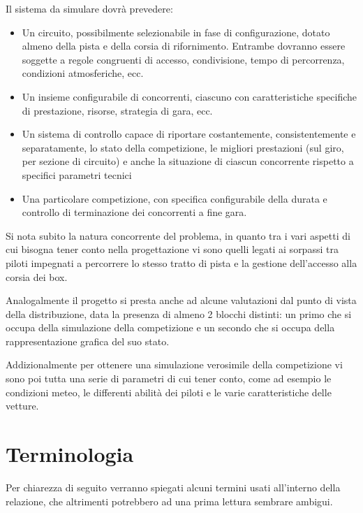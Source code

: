 \documentclass[a4paper,11pt, twoside, openright]{book}
\begin{document}
      Il sistema da simulare dovrà prevedere:
      \begin{itemize}
	\item Un circuito, possibilmente selezionabile in fase di configurazione, dotato almeno della pista e della corsia di 
	  rifornimento.
	  Entrambe dovranno essere soggette a regole congruenti di accesso, condivisione, 
	  tempo di percorrenza, condizioni atmosferiche, ecc.
	\item Un insieme configurabile di concorrenti, ciascuno con caratteristiche specifiche di prestazione, risorse, 
	  strategia di gara, ecc.
	\item Un sistema di controllo capace di riportare costantemente, consistentemente e separatamente, 
	  lo stato della competizione, le migliori prestazioni (sul giro, per sezione di circuito) e anche la 
	  situazione di ciascun concorrente rispetto a specifici parametri tecnici
	\item Una particolare competizione, con specifica configurabile della durata e controllo di terminazione 
	  dei concorrenti a fine gara.
      \end{itemize}
      
      Si nota subito la natura concorrente del problema, in quanto tra i vari aspetti di cui bisogna tener conto
      nella progettazione vi sono quelli legati ai sorpassi tra piloti impegnati a percorrere lo stesso tratto di pista
      e la gestione dell'accesso alla corsia dei box.
      
      Analogalmente il progetto si presta anche ad alcune valutazioni dal punto di vista della distribuzione, data
      la presenza di almeno 2 blocchi distinti: un primo che si occupa della simulazione della competizione e un secondo
      che si occupa della rappresentazione grafica del suo stato.
      
      Addizionalmente per ottenere una simulazione verosimile
      della competizione 
      vi sono poi tutta una serie di parametri di cui tener conto, 
      come ad esempio le condizioni meteo, le differenti abilità dei piloti e le varie caratteristiche 
      delle vetture.

      
    
    \section{Terminologia}
      Per chiarezza di seguito verranno spiegati alcuni termini usati all'interno della relazione, 
      che altrimenti potrebbero ad una prima lettura sembrare ambigui.
      
\end{document}
